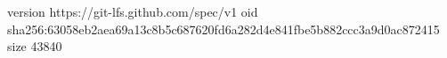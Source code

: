 version https://git-lfs.github.com/spec/v1
oid sha256:63058eb2aea69a13c8b5c687620fd6a282d4e841fbe5b882ccc3a9d0ac872415
size 43840
